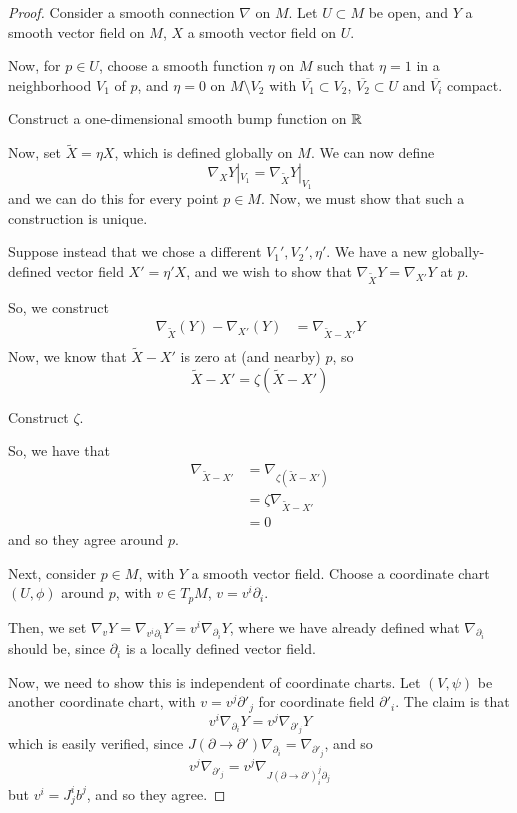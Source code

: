 \documentclass[../main.tex]{subfiles}
\begin{document}
\begin{proof}
    Consider a smooth connection $\nabla$ on $M$. Let $U\subset M$ be open, and
    $Y$ a smooth vector field on $M$, $X$ a smooth vector field on $U$. 

    Now, for $p\in U$, choose a smooth function $\eta$ on $M$ such that $\eta=1$
    in a neighborhood $V_1$ of $p$, and $\eta=0$ on $M\setminus V_2$ with
    $\overline{V_1}\subset V_2$, $\overline{V_2}\subset U$ and $\overline{V_i}$
    compact.

    \begin{hw}
        Construct a one-dimensional smooth bump function on $\mathbb{R}$
    \end{hw}

    Now, set $\tilde{X}=\eta X$, which is defined globally on $M$.
    We can now define
    \[
        \nabla_XY|_{V_1} = \nabla_{\tilde{X}}Y|_{V_1}
    \]
    and we can do this for every point $p\in M$. Now, we must show that such a
    construction is unique. 
    
    Suppose instead that we chose a different $V_1',V_2',\eta'$. We have a new
    globally-defined vector field $X'=\eta' X$, and we wish to show that
    $\nabla_{\tilde{X}}Y = \nabla_{X'}Y$ at $p$.

    So, we construct
    \[
        \begin{aligned}
            \nabla_{\tilde{X}}(Y) - \nabla_{X'}(Y) &= \nabla_{\tilde{X}-X'}Y\\
        \end{aligned}
    \]
    Now, we know that $\tilde{X}-X'$ is zero at (and nearby) $p$, so
    \[
        \tilde{X} -X' = \zeta(\tilde{X}-X')
    \]
    \begin{hw}
        Construct $\zeta$.
    \end{hw}
    So, we have that
    \[
        \begin{aligned}
            \nabla_{\tilde{X}-X'} &= \nabla_{\zeta(\tilde{X}-X')}\\
            &= \zeta\nabla_{\tilde{X}-X'}\\
            &=0
        \end{aligned}
    \]
    and so they agree around $p$.

    Next, consider $p\in M$, with $Y$ a smooth vector field. Choose a coordinate
    chart $(U,\phi)$ around $p$, with $v\in T_pM$, $v = v^i\partial_i$.

    Then, we set $\nabla_v Y = \nabla_{v^i\partial_i}Y =
    v^i\nabla_{\partial_i}Y$, where we have already defined what
    $\nabla_{\partial_i}$ should be, since $\partial_i$ is a locally defined
    vector field.

    Now, we need to show this is independent of coordinate charts. Let
    $(V,\psi)$ be another coordinate chart, with $v = v^j\partial'_j$ for
    coordinate field $\partial'_i$. The claim is that
    \[
        v^i\nabla_{\partial_i}Y = v^j\nabla_{\partial'_j}Y
    \]
    which is easily verified, since $J(\partial\to\partial')\nabla_{\partial_i}
    = \nabla_{\partial'_j}$, and so
    \[
        v^j\nabla_{\partial'_j} = v^j\nabla_{J(\partial\to\partial')^j_i\partial_j}
    \]
    but $v^i = J^i_jb^j$, and so they agree.
\end{proof}
\end{document}
